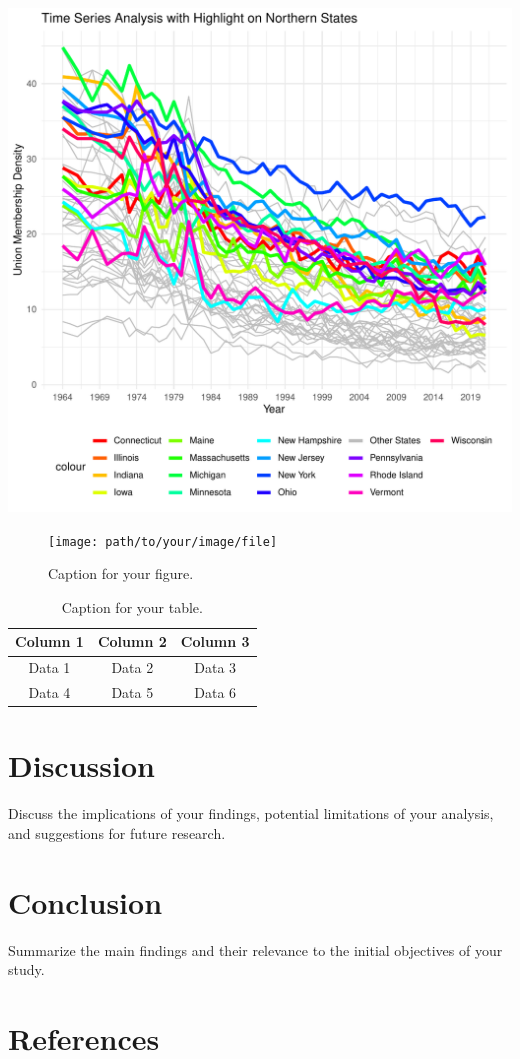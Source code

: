 \documentclass[11pt]{article}\usepackage[]{graphicx}\usepackage[]{xcolor}
\makeatletter
\def\maxwidth{ %
  \ifdim\Gin@nat@width>\linewidth
    \linewidth
  \else
    \Gin@nat@width
  \fi
}
\newenvironment{knitrout}{}{} %
\makeatother
\begin{document}
\begin{knitrout}
\includegraphics[width=\maxwidth]{figure/unnamed-chunk-1-2} 
\end{knitrout}

\begin{figure}[h!]
\centering
\texttt{[image: path/to/your/image/file]}
\caption{Caption for your figure.}
\label{fig:yourlabel}
\end{figure}

\begin{table}[h!]
\centering
\begin{tabular}{ccc}
\toprule
Column 1 & Column 2 & Column 3 \\
\midrule
Data 1 & Data 2 & Data 3 \\
Data 4 & Data 5 & Data 6 \\
\bottomrule
\end{tabular}
\caption{Caption for your table.}
\label{tab:yourlabel}
\end{table}

\section{Discussion}
Discuss the implications of your findings, potential limitations of your analysis, and suggestions for future research.

\section{Conclusion}
Summarize the main findings and their relevance to the initial objectives of your study.

\section{References}


\end{document}
